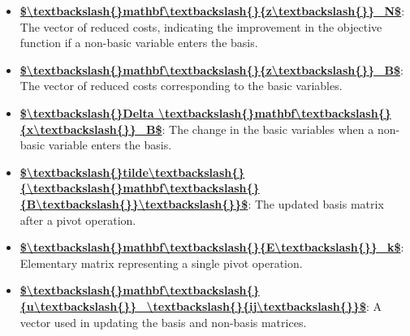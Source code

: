 \documentclass{article}%
\begin{document}
\begin{itemize}[leftmargin=*]
\item \href{https://www.math.purdue.edu/~yipn/421/2024-10-03-DualSimplexMatrix.pdf#page=7}{\textbf{\$\textbackslash{}textbackslash\{\}mathbf\textbackslash{}textbackslash\{\}\{z\textbackslash{}textbackslash\{\}\}\_N\$}}: The vector of reduced costs, indicating the improvement in the objective function if a non-basic variable enters the basis.%
\item \href{https://www.math.purdue.edu/~yipn/421/2024-10-03-DualSimplexMatrix.pdf#page=8}{\textbf{\$\textbackslash{}textbackslash\{\}mathbf\textbackslash{}textbackslash\{\}\{z\textbackslash{}textbackslash\{\}\}\_B\$}}: The vector of reduced costs corresponding to the basic variables.%
\item \href{https://www.math.purdue.edu/~yipn/421/2024-10-03-DualSimplexMatrix.pdf#page=9}{\textbf{\$\textbackslash{}textbackslash\{\}Delta \textbackslash{}textbackslash\{\}mathbf\textbackslash{}textbackslash\{\}\{x\textbackslash{}textbackslash\{\}\}\_B\$}}: The change in the basic variables when a non-basic variable enters the basis.%
\item \href{https://www.math.purdue.edu/~yipn/421/2024-10-03-DualSimplexMatrix.pdf#page=13}{\textbf{\$\textbackslash{}textbackslash\{\}tilde\textbackslash{}textbackslash\{\}\{\textbackslash{}textbackslash\{\}mathbf\textbackslash{}textbackslash\{\}\{B\textbackslash{}textbackslash\{\}\}\textbackslash{}textbackslash\{\}\}\$}}: The updated basis matrix after a pivot operation.%
\item \href{https://www.math.purdue.edu/~yipn/421/2024-10-03-DualSimplexMatrix.pdf#page=15}{\textbf{\$\textbackslash{}textbackslash\{\}mathbf\textbackslash{}textbackslash\{\}\{E\textbackslash{}textbackslash\{\}\}\_k\$}}: Elementary matrix representing a single pivot operation.%
\item \href{https://www.math.purdue.edu/~yipn/421/2024-10-03-DualSimplexMatrix.pdf#page=11}{\textbf{\$\textbackslash{}textbackslash\{\}mathbf\textbackslash{}textbackslash\{\}\{u\textbackslash{}textbackslash\{\}\}\_\textbackslash{}textbackslash\{\}\{ij\textbackslash{}textbackslash\{\}\}\$}}: A vector used in updating the basis and non-basis matrices.%
\end{itemize}%
\end{document}

